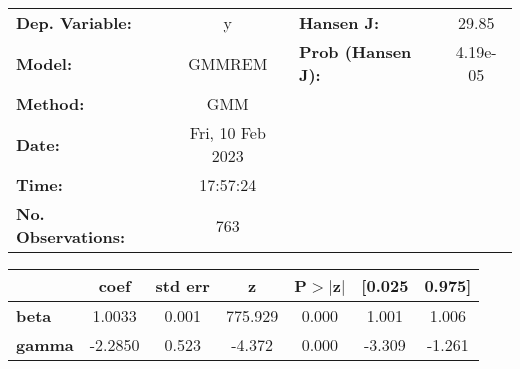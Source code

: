 \begin{center}
\begin{tabular}{lclc}
\toprule
\textbf{Dep. Variable:}    &        y         & \textbf{  Hansen J:          } &     29.85   \\
\textbf{Model:}            &      GMMREM      & \textbf{  Prob (Hansen J):   } &  4.19e-05   \\
\textbf{Method:}           &       GMM        & \textbf{                     } &             \\
\textbf{Date:}             & Fri, 10 Feb 2023 & \textbf{                     } &             \\
\textbf{Time:}             &     17:57:24     & \textbf{                     } &             \\
\textbf{No. Observations:} &         763      & \textbf{                     } &             \\
\bottomrule
\end{tabular}
\begin{tabular}{lcccccc}
               & \textbf{coef} & \textbf{std err} & \textbf{z} & \textbf{P$> |$z$|$} & \textbf{[0.025} & \textbf{0.975]}  \\
\midrule
\textbf{beta}  &       1.0033  &        0.001     &   775.929  &         0.000        &        1.001    &        1.006     \\
\textbf{gamma} &      -2.2850  &        0.523     &    -4.372  &         0.000        &       -3.309    &       -1.261     \\
\bottomrule
\end{tabular}
\end{center}